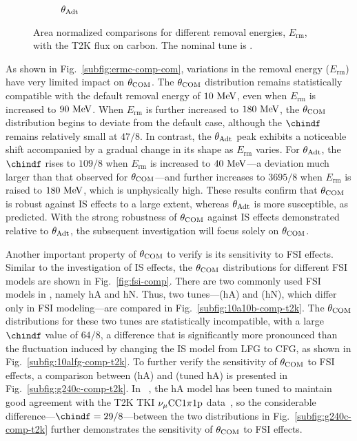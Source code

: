 \begin{figure}[ht!]
\begin{subfigure}[ht!]{\dbfigwid\textwidth}
          \caption{$\theta_{\textrm{Adt}}$}
          \label{subfig:ermc-comp-adt}
     \end{subfigure}
     \caption{Area normalized comparisons for different removal energies, $E_{\textrm{rm}}$, with the T2K flux on carbon. The nominal tune is \gZero.}
     \label{fig:ermc-comp}
     \end{figure}
     As shown in Fig.~\ref{subfig:ermc-comp-com}, variations in the removal energy ($E_{\textrm{rm}}$) have very limited impact on $\theta_{\textrm{COM}}$. 
     The $\theta_{\textrm{COM}}$ distribution remains statistically compatible with the default removal energy of $10~\textrm{MeV}$, even when $E_{\textrm{rm}}$ is increased to $90~\textrm{MeV}$.
     When $E_{\textrm{rm}}$ is further increased to $180~\textrm{MeV}$, the $\theta_{\textrm{COM}}$ distribution begins to deviate from the default case, although the $\chindf$ remains relatively small at $47/8$.
     In contrast, the $\theta_{\textrm{Adt}}$ peak exhibits a noticeable shift accompanied by a gradual change in its shape as $E_{\textrm{rm}}$ varies.
     For $\theta_{\textrm{Adt}}$, the $\chindf$ rises to $109/8$ when $E_{\textrm{rm}}$ is increased to $40~\textrm{MeV}$—a deviation much larger than that observed for $\theta_{\textrm{COM}}$—and further increases to $3695/8$ when $E_{\textrm{rm}}$ is raised to $180~\textrm{MeV}$, which is unphysically high.
     These results confirm that $\theta_{\textrm{COM}}$ is robust against IS effects to a large extent, whereas $\theta_{\textrm{Adt}}$ is more susceptible, as predicted.
     With the strong robustness of $\theta_{\textrm{COM}}$ against IS effects demonstrated relative to $\theta_{\textrm{Adt}}$, the subsequent investigation will focus solely on $\theta_{\textrm{COM}}$.

     Another important property of $\theta_{\textrm{COM}}$ to verify is its sensitivity to FSI effects.
     Similar to the investigation of IS effects, the $\theta_{\textrm{COM}}$ distributions for different FSI models are shown in Fig.~\ref{fig:fsi-comp}.
     There are two commonly used FSI models in \genie, namely hA and hN.
     Thus, two \genie tunes—\geta (hA) and \getb (hN), which differ only in FSI modeling—are compared in Fig.~\ref{subfig:10a10b-comp-t2k}.
     The $\theta_{\textrm{COM}}$ distributions for these two tunes are statistically incompatible, with a large $\chindf$ value of $64/8$, a difference that is significantly more pronounced than the fluctuation induced by changing the IS model from LFG to CFG, as shown in Fig.~\ref{subfig:10alfg-comp-t2k}.
     To further verify the sensitivity of $\theta_{\textrm{COM}}$ to FSI effects, a comparison between \gZero (hA) and \gC (tuned hA) is presented in Fig.~\ref{subfig:g240c-comp-t2k}.
     In \gC~\cite{GENIE:2024ufm}, the hA model has been tuned to maintain good agreement with the T2K TKI $\nu_{\mu}\textrm{CC}1\pi1\textrm{p}$ data~\cite{T2K:2021naz}, so the considerable difference—$\chindf=29/8$—between the two distributions in Fig.~\ref{subfig:g240c-comp-t2k} further demonstrates the sensitivity of $\theta_{\textrm{COM}}$ to FSI effects.

